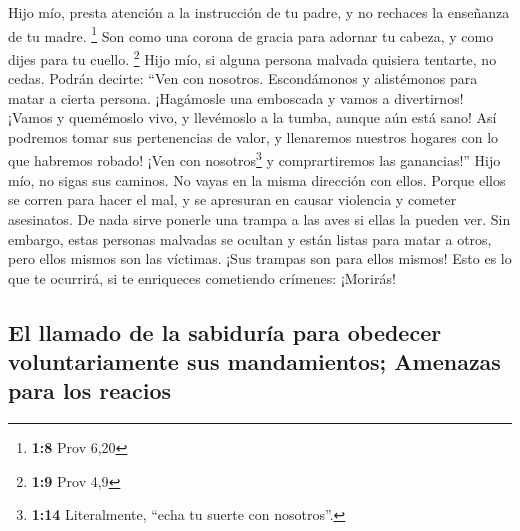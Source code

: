  Hijo mío, presta atención a la instrucción de tu padre, y
no rechaces la enseñanza de tu madre. \footnote{\textbf{1:8} Prov 6,20}
 Son como una corona de gracia para adornar tu cabeza, y
como dijes para tu cuello. \footnote{\textbf{1:9} Prov 4,9}
 Hijo mío, si alguna persona malvada quisiera tentarte,
no cedas.  Podrán decirte: ``Ven con nosotros.
Escondámonos y alistémonos para matar a cierta persona. ¡Hagámosle una
emboscada y vamos a divertirnos!  ¡Vamos y quemémoslo
vivo, y llevémoslo a la tumba, aunque aún está sano!  Así
podremos tomar sus pertenencias de valor, y llenaremos nuestros hogares
con lo que habremos robado!  ¡Ven con nosotros\footnote{\textbf{1:14}
  Literalmente, ``echa tu suerte con nosotros''.} y comprartiremos las
ganancias!''  Hijo mío, no sigas sus caminos. No vayas en
la misma dirección con ellos.  Porque ellos se corren
para hacer el mal, y se apresuran en causar violencia y cometer
asesinatos.  De nada sirve ponerle una trampa a las aves
si ellas la pueden ver.  Sin embargo, estas personas
malvadas se ocultan y están listas para matar a otros, pero ellos mismos
son las víctimas. ¡Sus trampas son para ellos mismos! 
Esto es lo que te ocurrirá, si te enriqueces cometiendo crímenes:
¡Morirás!

\hypertarget{el-llamado-de-la-sabiduruxeda-para-obedecer-voluntariamente-sus-mandamientos-amenazas-para-los-reacios}{%
\subsection{El llamado de la sabiduría para obedecer voluntariamente sus
mandamientos; Amenazas para los
reacios}\label{el-llamado-de-la-sabiduruxeda-para-obedecer-voluntariamente-sus-mandamientos-amenazas-para-los-reacios}}

